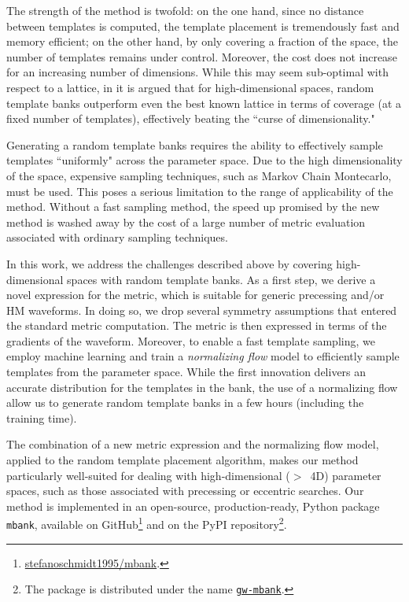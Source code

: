 \documentclass[twocolumn,showpacs,preprintnumbers,nofootinbib,prd,
superscriptaddress,10pt]{revtex4-2}
\begin{document}
The strength of the method is twofold: on the one hand, since no distance between templates is computed, the template placement is tremendously fast and memory efficient; on the other hand, by only covering a fraction of the space, the number of templates remains under control.
Moreover, the cost does not increase for an increasing number of dimensions.
While this may seem sub-optimal with respect to a lattice, in \cite{Messenger:2008ta, Allen:2022lqr, Allen:2021yuy} it is argued that for high-dimensional spaces, random template banks outperform even the best known lattice in terms of coverage (at a fixed number of templates), effectively beating the ``curse of dimensionality."

Generating a random template banks requires the ability to effectively sample templates ``uniformly" across the parameter space. Due to the high dimensionality of the space, expensive sampling techniques, such as Markov Chain Montecarlo, must be used. This poses a serious limitation to the range of applicability of the method. Without a fast sampling method, the speed up promised by the new method is washed away by the cost of a large number of metric evaluation associated with ordinary sampling techniques.

In this work, we address the challenges described above by covering high-dimensional spaces with random template banks.
As a first step, we derive a novel expression for the metric, which is suitable for generic precessing and/or HM waveforms. In doing so, we drop several symmetry assumptions that entered the standard metric computation. The metric is then expressed in terms of the gradients of the waveform.
Moreover, to enable a fast template sampling, we employ machine learning and train a {\it normalizing flow} model to efficiently sample templates from the parameter space.
While the first innovation delivers an accurate distribution for the templates in the bank, the use of a normalizing flow allow us to generate random template banks in a few hours (including the training time).

The combination of a new metric expression and the normalizing flow model, applied to the random template placement algorithm, makes our method particularly well-suited for dealing with high-dimensional ($>$~4D) parameter spaces, such as those associated with precessing or eccentric searches.
Our method is implemented in an open-source, production-ready, Python package \texttt{mbank}\cite{mbank}, available on GitHub\footnote{
\href{https://github.com/stefanoschmidt1995/mbank}{stefanoschmidt1995/mbank}.}
and on the PyPI repository\footnote{
The package is distributed under the name \texttt{\href{https://pypi.org/project/gw-mbank/}{gw-mbank}}.
}.
\end{document}
